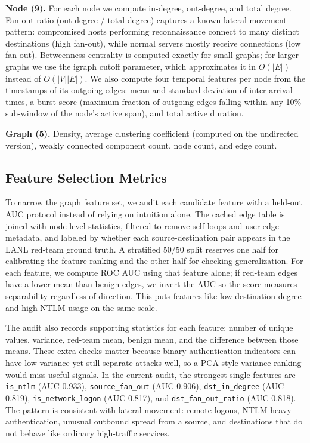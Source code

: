 \documentclass[letterpaper,twocolumn,10pt]{article}
\begin{document}
\textbf{Node (9).}
For each node we compute in-degree, out-degree, and total degree. Fan-out ratio (out-degree / total degree) captures a known lateral movement pattern: compromised hosts performing reconnaissance connect to many distinct destinations (high fan-out), while normal servers mostly receive connections (low fan-out). Betweenness centrality is computed exactly for small graphs; for larger graphs we use the igraph cutoff parameter, which approximates it in $O(|E|)$ instead of $O(|V||E|)$. We also compute four temporal features per node from the timestamps of its outgoing edges: mean and standard deviation of inter-arrival times, a burst score (maximum fraction of outgoing edges falling within any 10\% sub-window of the node's active span), and total active duration.

\textbf{Graph (5).}
Density, average clustering coefficient (computed on the undirected version), weakly connected component count, node count, and edge count.

\subsection{Feature Selection Metrics}

To narrow the graph feature set, we audit each candidate feature with a held-out AUC protocol instead of relying on intuition alone. The cached edge table is joined with node-level statistics, filtered to remove self-loops and user-edge metadata, and labeled by whether each source-destination pair appears in the LANL red-team ground truth. A stratified 50/50 split reserves one half for calibrating the feature ranking and the other half for checking generalization. For each feature, we compute ROC AUC using that feature alone; if red-team edges have a lower mean than benign edges, we invert the AUC so the score measures separability regardless of direction. This puts features like low destination degree and high NTLM usage on the same scale.

The audit also records supporting statistics for each feature: number of unique values, variance, red-team mean, benign mean, and the difference between those means. These extra checks matter because binary authentication indicators can have low variance yet still separate attacks well, so a PCA-style variance ranking would miss useful signals. In the current audit, the strongest single features are \texttt{is\_ntlm} (AUC 0.933), \texttt{source\_fan\_out} (AUC 0.906), \texttt{dst\_in\_degree} (AUC 0.819), \texttt{is\_network\_logon} (AUC 0.817), and \texttt{dst\_fan\_out\_ratio} (AUC 0.818). The pattern is consistent with lateral movement: remote logons, NTLM-heavy authentication, unusual outbound spread from a source, and destinations that do not behave like ordinary high-traffic services.
\end{document}
